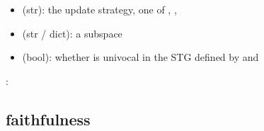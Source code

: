 \documentclass[letterpaper,10pt,english]{sphinxmanual}
\begin{document}
\begin{fulllineitems}
\begin{description}
\begin{itemize}
\item {} 
 (str): the update strategy, one of , , 

\item {} 
 (str / dict): a subspace

\end{itemize}

\item[{\sphinxstylestrong{returns}:}] \leavevmode\begin{itemize}
\item {} 
 (bool): whether  is univocal in the STG defined by  and 

\end{itemize}

\end{description}

:

\begin{sphinxVerbatim}[commandchars=\\\{\}]
   
  \PYG{p}{[}\PYG{p}{]}
  
\end{sphinxVerbatim}

\end{fulllineitems}



\subsection{faithfulness}
\label{\detokenize{AttractorDetection:id5}}\label{\detokenize{AttractorDetection:faithfulness}}
\end{document}
